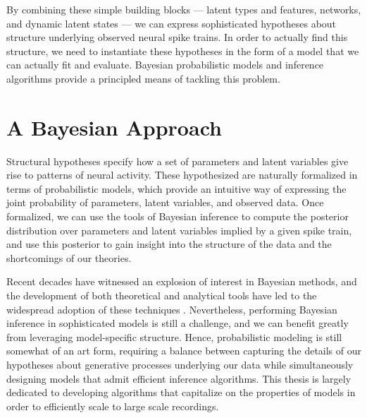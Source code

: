 By combining these simple building blocks --- latent types and features, 
networks, and dynamic latent states --- we can express sophisticated 
hypotheses about structure underlying observed neural spike trains. 
In order to actually find this structure, we need to instantiate these 
hypotheses in the form of a model that we can actually fit and evaluate.
Bayesian probabilistic models and inference algorithms provide a principled 
means of tackling this problem.


\section{A Bayesian Approach} 
Structural hypotheses specify how a set of parameters and latent
variables give rise to patterns of neural activity.  These
hypothesized are naturally formalized in terms of probabilistic
models, which provide an intuitive way of expressing the joint
probability of parameters, latent variables, and observed data.  Once
formalized, we can use the tools of Bayesian inference to compute the
posterior distribution over parameters and latent variables implied by
a given spike train, and use this posterior to gain insight into the
structure of the data and the shortcomings of our theories.

Recent decades have witnessed an explosion of interest in Bayesian
methods, and the development of both theoretical and analytical tools
have led to the widespread adoption of these techniques
\citep{bishop2006pattern, murphy2012probabilistic}. 
Nevertheless, performing Bayesian inference in sophisticated models 
is still a challenge, and we can benefit greatly from leveraging 
model-specific structure. 
Hence, probabilistic modeling is still somewhat of an art
form, requiring a balance between capturing the details of our
hypotheses about generative processes underlying our data while
simultaneously designing models that admit efficient inference algorithms.
This thesis is largely dedicated to developing algorithms that
capitalize on the properties of models in order to efficiently scale
to large scale recordings.


